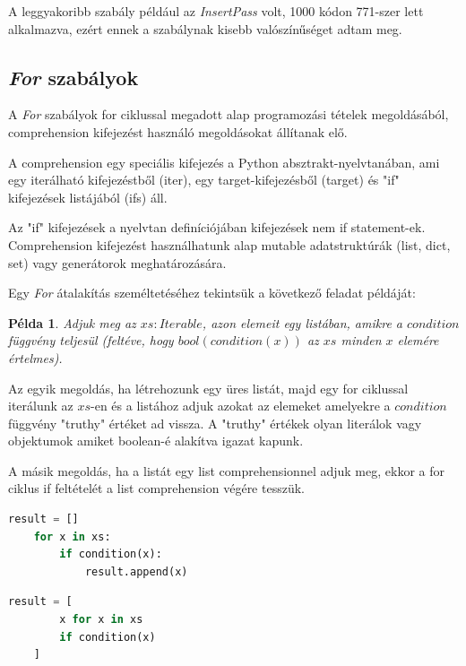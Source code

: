A leggyakoribb szabály például az \emph{InsertPass} volt, 1000 kódon 771-szer lett alkalmazva,
ezért ennek a szabálynak kisebb valószínűséget adtam meg.

\subsection{\emph{For} szabályok}

A \emph{For} szabályok for ciklussal megadott alap programozási tételek megoldásából,
comprehension kifejezést használó megoldásokat állítanak elő.

A comprehension egy speciális kifejezés a Python absztrakt-nyelvtanában, ami
egy iterálható kifejezéstből (iter), egy target-kifejezésből (target)
és "if" kifejezések listájából (ifs) áll.

Az "if" kifejezések a nyelvtan definíciójában kifejezések nem if statement-ek.
Comprehension kifejezést használhatunk alap
mutable adatstruktúrák (list, dict, set) vagy generátorok meghatározására.

Egy \emph{For} átalakítás személtetéséhez tekintsük a következő feladat példáját:

\newtheorem{example}{Példa}
\begin{example}
Adjuk meg az $xs: Iterable$, azon elemeit egy listában,
amikre a $condition$ függvény teljesül
(feltéve, hogy $bool(condition(x))$ az $xs$ minden $x$ elemére értelmes).
\end{example}

Az egyik megoldás, ha létrehozunk egy üres listát,
majd egy for ciklussal iterálunk az $xs$-en és
a listához adjuk azokat az elemeket amelyekre a $condition$ függvény "truthy" értéket ad vissza.
A "truthy" értékek olyan literálok vagy objektumok amiket boolean-é alakítva igazat kapunk.

A másik megoldás, ha a listát egy list comprehensionnel adjuk meg,
ekkor a for ciklus if feltételét a list comprehension végére tesszük.

\noindent
\begin{minipage}[t]{.48\textwidth}
\begin{lstlisting}[language={Python}]
	result = []
	for x in xs:
		if condition(x):
			result.append(x)
\end{lstlisting}
\end{minipage}
\hfill
\begin{minipage}[t]{.48\textwidth}
\begin{lstlisting}[language={Python}]
	result = [
		x for x in xs
		if condition(x)
	]
\end{lstlisting}
\end{minipage}

